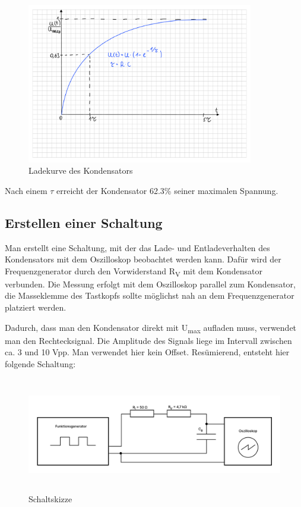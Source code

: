 \begin{figure}[H]
	\centering
	\includegraphics[height=7cm]{images/Versuch1/Ladekurve_zeichnung.pdf} 
	\caption{Ladekurve des Kondensators}
	\label{fig: Ladekurve des Kondensators}
\end{figure}

Nach einem $\tau$ erreicht der Kondensator 62.3\% seiner maximalen Spannung. 

\subsection{Erstellen einer Schaltung}

Man erstellt eine Schaltung, mit der das Lade- und Entladeverhalten des Kondensators
mit dem Oszilloskop beobachtet werden kann. Dafür wird der Frequenzgenerator
durch den Vorwiderstand R\textsubscript{V} mit dem Kondensator verbunden.
Die Messung erfolgt mit dem Oszilloskop parallel zum Kondensator, 
die Masseklemme des Tastkopfs sollte möglichst nah an dem Frequenzgenerator
platziert werden.

Dadurch, dass man den Kondensator direkt mit U\textsubscript{max} aufladen
muss, verwendet man den Rechtecksignal. Die Amplitude des Signals liege 
im Intervall zwischen ca. 3 und 10 Vpp. Man verwendet hier kein Offset.
Resümierend, entsteht hier folgende Schaltung:
\begin{figure}[H]
	\centering
	\includegraphics[height=5cm]{images/Versuch1/Schaltbild_versuch1.pdf} 
	\caption{Schaltskizze}
	\label{fig: Schaltskizze}
\end{figure}


